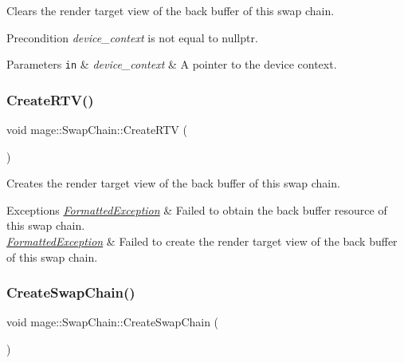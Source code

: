 Clears the render target view of the back buffer of this swap chain.

\begin{DoxyPrecond}{Precondition}
{\itshape device\+\_\+context} is not equal to {\ttfamily nullptr}. 
\end{DoxyPrecond}

\begin{DoxyParams}[1]{Parameters}
\mbox{\tt in}  & {\em device\+\_\+context} & A pointer to the device context. \\
\hline
\end{DoxyParams}
\hypertarget{classmage_1_1_swap_chain_a9cdb798d8911e2f1239ad7eb79cc6b87}{}\label{classmage_1_1_swap_chain_a9cdb798d8911e2f1239ad7eb79cc6b87} 
\subsubsection{\texorpdfstring{Create\+R\+T\+V()}{CreateRTV()}}
{\footnotesize\ttfamily void mage\+::\+Swap\+Chain\+::\+Create\+R\+TV (\begin{DoxyParamCaption}{ }\end{DoxyParamCaption})\hspace{0.3cm}{\ttfamily [private]}}

Creates the render target view of the back buffer of this swap chain.


\begin{DoxyExceptions}{Exceptions}
{\em \hyperlink{structmage_1_1_formatted_exception}{Formatted\+Exception}} & Failed to obtain the back buffer resource of this swap chain. \\
\hline
{\em \hyperlink{structmage_1_1_formatted_exception}{Formatted\+Exception}} & Failed to create the render target view of the back buffer of this swap chain. \\
\hline
\end{DoxyExceptions}
\hypertarget{classmage_1_1_swap_chain_a9474cae31868f020c76439febc6e1afd}{}\label{classmage_1_1_swap_chain_a9474cae31868f020c76439febc6e1afd} 
\subsubsection{\texorpdfstring{Create\+Swap\+Chain()}{CreateSwapChain()}}
{\footnotesize\ttfamily void mage\+::\+Swap\+Chain\+::\+Create\+Swap\+Chain (\begin{DoxyParamCaption}{ }\end{DoxyParamCaption})\hspace{0.3cm}{\ttfamily [private]}}

